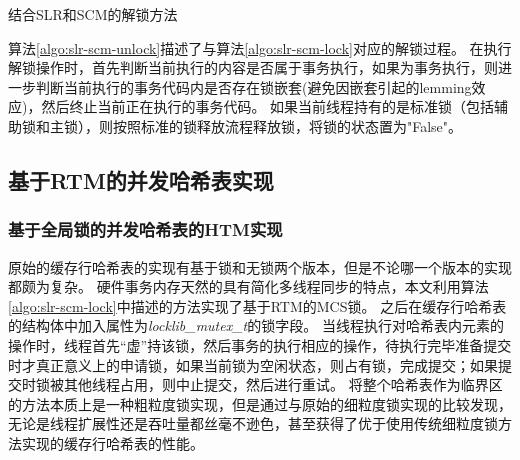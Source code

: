 \begin{algorithm}[htbp]
\SetAlgoLined
{}
\caption{结合SLR和SCM的解锁方法}
\label{algo:slr-scm-unlock}
\end{algorithm}

算法\ref{algo:slr-scm-unlock}描述了与算法\ref{algo:slr-scm-lock}对应的解锁过程。
在执行解锁操作时，首先判断当前执行的内容是否属于事务执行，如果为事务执行，则进一步判断当前执行的事务代码内是否存在锁嵌套(避免因嵌套引起的lemming效应)，然后终止当前正在执行的事务代码。
如果当前线程持有的是标准锁（包括辅助锁和主锁），则按照标准的锁释放流程释放锁，将锁的状态置为"False"。

\subsection{基于RTM的并发哈希表实现}

\subsubsection{基于全局锁的并发哈希表的HTM实现}

原始的缓存行哈希表的实现有基于锁和无锁两个版本，但是不论哪一个版本的实现都颇为复杂。
硬件事务内存天然的具有简化多线程同步的特点，本文利用算法\ref{algo:slr-scm-lock}中描述的方法实现了基于RTM的MCS锁。
之后在缓存行哈希表的结构体中加入属性为\textit{locklib\_mutex\_t}的锁字段。
当线程执行对哈希表内元素的操作时，线程首先“虚”持该锁，然后事务的执行相应的操作，待执行完毕准备提交时才真正意义上的申请锁，如果当前锁为空闲状态，则占有锁，完成提交；如果提交时锁被其他线程占用，则中止提交，然后进行重试。
将整个哈希表作为临界区的方法本质上是一种粗粒度锁实现，但是通过与原始的细粒度锁实现的比较发现，无论是线程扩展性还是吞吐量都丝毫不逊色，甚至获得了优于使用传统细粒度锁方法实现的缓存行哈希表的性能。

